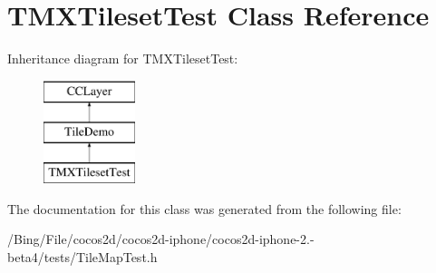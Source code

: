 \hypertarget{interface_t_m_x_tileset_test}{\section{T\-M\-X\-Tileset\-Test Class Reference}
\label{interface_t_m_x_tileset_test}
}
Inheritance diagram for T\-M\-X\-Tileset\-Test\-:\begin{figure}[H]
\begin{center}
\leavevmode
\includegraphics[height=3.000000cm]{interface_t_m_x_tileset_test}
\end{center}
\end{figure}


The documentation for this class was generated from the following file\-:\begin{DoxyCompactItemize}
\item 
/\-Bing/\-File/cocos2d/cocos2d-\/iphone/cocos2d-\/iphone-\/2.-\/beta4/tests/Tile\-Map\-Test.\-h\end{DoxyCompactItemize}
